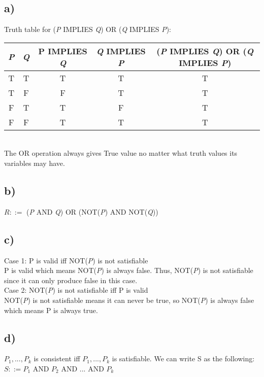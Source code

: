 \documentclass[12pt]{article}
\begin{document}
\subsection*{a)}
Truth table for (\textit{P} IMPLIES \textit{Q}) OR (\textit{Q} IMPLIES \textit{P}):\\

\begin{tabular}{|c|c|c|c|c|}
\hline 
\textbf{\textit{P}} & \textbf{\textit{Q}} & \textbf{P} \textbf{IMPLIES \textit{\textit{Q}}} & \textbf{\textit{Q} IMPLIES \textit{P}} & \textbf{(\textit{P} IMPLIES \textit{Q}) OR (\textit{Q} IMPLIES \textit{P})} \\ 
\hline 
T & T & T & T & T \\ 
\hline 
T & F & F & T & T \\ 
\hline 
F & T & T & F & T \\ 
\hline 
F & F & T & T & T \\ 
\hline 
\end{tabular}\\

The OR operation always gives True value no matter what truth values its variables may have.
\subsection*{b)}
$R::=$ (\textit{P} AND \textit{Q}) OR (NOT(\textit{P}) AND NOT(\textit{Q}))
\subsection*{c)}
Case 1: P is valid iff NOT(\textit{P}) is not satisfiable\\
P is valid which means NOT(\textit{P}) is always false. Thus, NOT(\textit{P}) is not satisfiable since it can only produce false in this case.\\
Case 2: NOT(\textit{P}) is not satisfiable iff P is valid\\
NOT(\textit{P}) is not satisfiable means it can never be true, so NOT(\textit{P}) is always false which means P is always true.
\subsection*{d)}
$P_1,...,P_k$ is consistent iff $P_1,...,P_k$ is satisfiable. We can write S as the following:\\
$S::= P_1$ AND $P_2$ AND ... AND $P_k$ 
\end{document}
